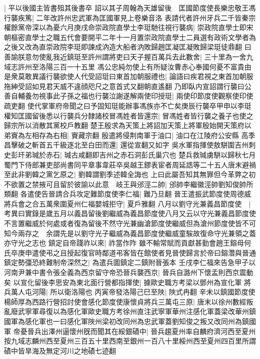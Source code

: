 |{
	平以後國主皆書殂其後書卒}
詔以其子周翰為天雄留後　匡國節度使長樂忠敬王馮行襲疾篤|{
	二年改許州忠武軍為匡國軍見上卷樂音洛}
表請代者許州牙兵二千皆秦宗權餘黨帝深以為憂六月庚戌命崇政院直學士李珽馳往視行襲病|{
	崇政院直學士即宋朝樞密直學士之職五代會要開平二年十一月置崇政院直學士二員選有政術文學者為之後又改為直崇政院李珽即諫成汭造大船者汭敗歸趙匡凝匡凝敗歸梁珽徒鼎翻}
曰善諭朕意勿使亂我近鎮珽至許州謂將吏曰天子握百萬兵去此數舍|{
	三十里為一舍九域志許州至洛陽三百一十五里}
馮公忠純勿使上有所疑汝曹赤心奉國何憂不富貴由是衆莫敢異議行襲欲使人代受詔珽曰東首加朝服禮也|{
	論語曰疾君視之東首加朝服拖紳受詔如見君天威不違顔咫尺之意首式又翻朝直遙翻}
乃即臥内宣詔謂行襲曰公善自輔養勿視事此子孫之福也行襲泣謝遂解兩使印授珽|{
	兩使印節度使觀察使印使疏吏翻}
使代掌軍府帝聞之曰予固知珽能辦事馮族亦不亡矣庚辰行襲卒甲申以李珽權知匡國留後悉以行襲兵分隸諸校冒馮姓者皆還宗|{
	冒馮姓者皆行襲之養子也使之歸宗所以消散其黨校戶教翻}
楚王殷求為天策上將詔加天策上將軍殷始開天策府以弟賨為左相存為右相|{
	賨藏宗翻}
殷遣將侵荆南軍于油口|{
	油口在江陵府公安縣}
高季昌擊破之斬首五千級逐北至白田而還|{
	還從宣翻又如字}
吳水軍指揮使敖駢圍吉州刺史彭玕弟瑊於赤石|{
	瑊古咸翻即吉州之赤石洞彭氏巢穴也}
楚兵救瑊虜駢以歸秋七月蜀門下侍郎兼吏部尚書同平章事韋莊卒吳越王鏐表宦者周延誥等二十五人唐末避禍至此非劉韓之黨乞原之|{
	劉韓謂劉季述韓全誨也}
上曰此屬吾知其無罪但今革弊之初不欲置之禁掖可且留於彼諭以此意　岐王與邠涇二帥|{
	邠帥李繼徽涇帥劉知俊帥所類翻}
各遣使告晉請合兵攻定難節度使李仁福|{
	難乃旦翻}
晉王遣振武節度使周德威將兵會之合五萬衆圍夏州仁福嬰城拒守|{
	夏戶雅翻}
八月以劉守光兼義昌節度使　|{
	考異曰實錄是歲五月以義昌留後劉繼威為義昌節度使八月又云以守光兼義昌節度使不言置繼威於何處或者復為留後不然守光兼幽滄節度使繼威但為滄州節度使皆不可知今兩存之　余謂先是以劉守光子繼威為義昌節度使繼威童騃故復命守光兼領之蓋亦守光之志也}
鎮定自帝踐祚以來|{
	祚當作阼}
雖不輸常賦而貢獻甚勤會趙王鎔母何氏卒庚申遣使弔之且授起復官時鄰道弔客皆在館使者見晉使歸言於帝曰鎔濳與晉通鎮定勢彊恐終難制帝深然之|{
	為遣兵圖鎮定二鎮附晉張本}
壬戌李仁福來告急甲子以河南尹兼中書令張全義為西京留守帝恐晉兵襲西京|{
	晉兵自潞州下懷孟則西京震動矣}
以宣化留後李思安為東北面行營都指揮使|{
	據歐史職方考梁以鄧州為宣化軍}
將兵萬人屯河陽|{
	所以衛洛陽也}
丙寅帝發洛陽己巳至陜|{
	陜式冉翻}
辛未以鎮國節度使楊師厚為西路行營招討使會感化節度使康懷貞將兵三萬屯三原|{
	唐末以徐州數經叛亂廢武寧軍尋復以為感化軍歐史職方考徐州直注武寧軍華州注感化軍蓋梁改華州鎮國軍為感化軍也一曰感化軍陜州梁初改同州為忠武軍蓋劉知俊之叛又改同州為鎮國軍}
帝憂晉兵出澤州逼懷州旣而聞其在綏銀磧中|{
	晉兵趨夏州率自麟府濟河西至夏州按九域志麟州西至夏州三百五十里西南至銀州一百八十里綏州西至夏州四百里所謂磧中皆旱海及無定河川之地磧七迹翻}
